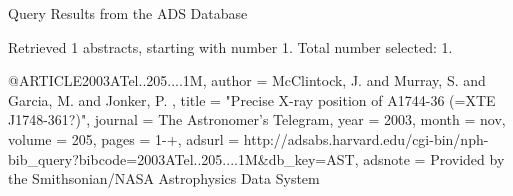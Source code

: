 Query Results from the ADS Database


Retrieved 1 abstracts, starting with number 1.  Total number selected: 1.

@ARTICLE{2003ATel..205....1M,
   author = {{McClintock}, J. and {Murray}, S. and {Garcia}, M. and {Jonker}, P.
	},
    title = "{Precise X-ray position of A1744-36 (=XTE J1748-361?)}",
  journal = {The Astronomer's Telegram},
     year = 2003,
    month = nov,
   volume = 205,
    pages = {1-+},
   adsurl = {http://adsabs.harvard.edu/cgi-bin/nph-bib_query?bibcode=2003ATel..205....1M&db_key=AST},
  adsnote = {Provided by the Smithsonian/NASA Astrophysics Data System}
}


